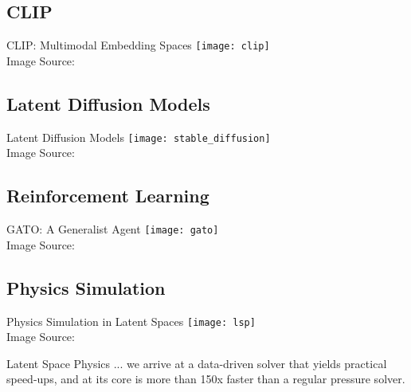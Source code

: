 \subsection{CLIP}
\begin{frame}[c]{CLIP: Multimodal Embedding Spaces}
    \texttt{[image: clip]} \\
    Image Source: \cite{radford_learning_2021}
\end{frame}

\subsection{Latent Diffusion Models}
\begin{frame}[c]{Latent Diffusion Models}
    \texttt{[image: stable\_diffusion]} \\
    Image Source: \cite{rombach_highresolution_2022}
\end{frame}

\subsection{Reinforcement Learning}
\begin{frame}[c]{GATO: A Generalist Agent}
    \texttt{[image: gato]} \\
    Image Source: \cite{reed_generalist_2022}
\end{frame}

\subsection{Physics Simulation}
\begin{frame}[c]{Physics Simulation in Latent Spaces}
    \texttt{[image: lsp]} \\
    Image Source: \cite{wiewel_latent_2019}
    \large
    \begin{aquote}{Latent Space Physics \cite{wiewel_latent_2019}}
        ... we arrive at a data-driven solver that yields practical speed-ups, and
        at its core is more than 150x faster than a regular pressure solver.
    \end{aquote}
\end{frame}

